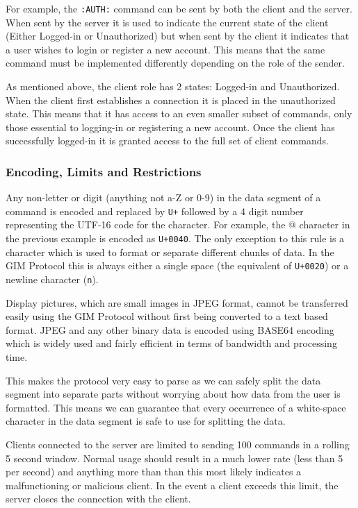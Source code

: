 For example, the \texttt{:AUTH:} command can be sent by both the client and the server. When sent by the server it is used to indicate the current state of the client (Either Logged-in or Unauthorized) but when sent by the client it indicates that a user wishes to login or register a new account. This means that the same command must be implemented differently depending on the role of the sender.

As mentioned above, the client role has 2 states: Logged-in and Unauthorized. When the client first establishes a connection it is placed in the unauthorized state. This means that it has access to an even smaller subset of commands, only those essential to logging-in or registering a new account. Once the client has successfully logged-in it is granted access to the full set of client commands.


\subsubsection{Encoding, Limits and Restrictions}

Any non-letter or digit (anything not a-Z or 0-9) in the data segment of a command is encoded and replaced by \texttt{\SLASH U+} followed by a 4 digit number representing the UTF-16 code for the character. For example, the @ character in the previous example is encoded as \texttt{\SLASH U+0040}. The only exception to this rule is a character which is used to format or separate different chunks of data. In the GIM Protocol this is always either a single space (the equivalent of \texttt{\SLASH U+0020}) or a newline character (\texttt{\SLASH n}).

Display pictures, which are small images in JPEG format, cannot be transferred easily using the GIM Protocol without first being converted to a text based format. JPEG and any other binary data is encoded using BASE64 encoding which is widely used and fairly efficient in terms of bandwidth and processing time.

This makes the protocol very easy to parse as we can safely split the data segment into separate parts without worrying about how data from the user is formatted. This means we can guarantee that every occurrence of a white-space character in the data segment is safe to use for splitting the data.

Clients connected to the server are limited to sending 100 commands in a rolling 5 second window. Normal usage should result in a much lower rate (less than 5 per second) and anything more than than this most likely indicates a malfunctioning or malicious client. In the event a client exceeds this limit, the server closes the connection with the client.

